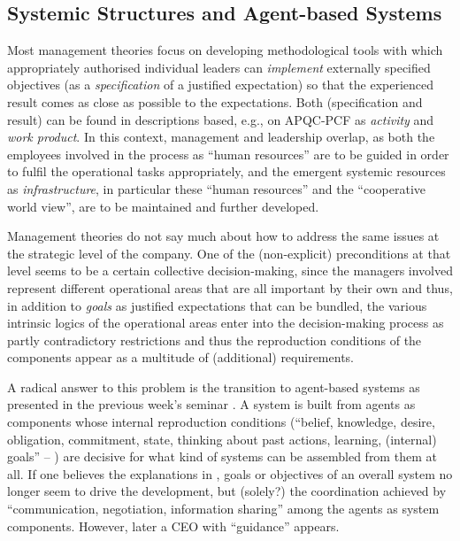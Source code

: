 \documentclass[11pt,a4paper]{article}
\begin{document}
\subsection{Systemic Structures and Agent-based Systems}

Most management theories focus on developing methodological tools with which
appropriately authorised individual leaders can \emph{implement} externally
specified objectives (as a \emph{specification} of a justified expectation) so
that the experienced result comes as close as possible to the expectations.
Both (specification and result) can be found in descriptions based, e.g., on
APQC-PCF as \emph{activity} and \emph{work product}. In this context,
management and leadership overlap, as both the employees involved in the
process as \enquote{human resources} are to be guided in order to fulfil the
operational tasks appropriately, and the emergent systemic resources as
\emph{infrastructure}, in particular these \enquote{human resources} and the
\enquote{cooperative world view}, are to be maintained and further developed.

Management theories do not say much about how to address the same issues at the
strategic level of the company. One of the (non-explicit) preconditions at
that level seems to be a certain collective decision-making, since the
managers involved represent different operational areas that are all important
by their own and thus, in addition to \emph{goals} as justified expectations
that can be bundled, the various intrinsic logics of the operational areas
enter into the decision-making process as partly contradictory restrictions
and thus the reproduction conditions of the components appear as a multitude
of (additional) requirements.
\enlargethispage{1em}

A radical answer to this problem is the transition to agent-based systems as
presented in the previous week's seminar \cite{Haertel2021}. A system is built
from agents as components whose internal reproduction conditions
(\enquote{belief, knowledge, desire, obligation, commitment, state, thinking
  about past actions, learning, (internal) goals} --
\cite[slide~9]{Haertel2021}) are decisive for what kind of systems can be
assembled from them at all. If one believes the explanations in
\cite{Haertel2021}, goals or objectives of an overall system no longer seem to
drive the development, but (solely?) the coordination achieved by
\enquote{communication, negotiation, information sharing}
\cite[slide~34]{Haertel2021} among the agents as system components. However,
later \cite[slide~35]{Haertel2021} a CEO with \enquote{guidance} appears.
\end{document}
